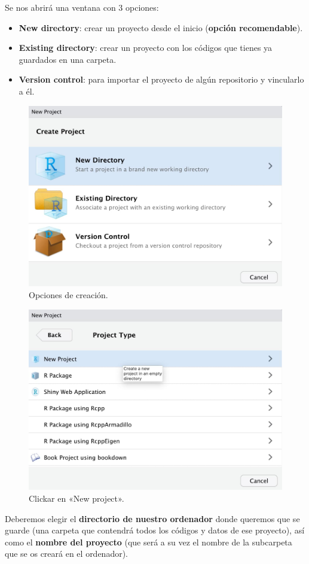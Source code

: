 \documentclass[11pt,]{book}
\begin{document}
Se nos abrirá una ventana con 3 opciones:

\begin{itemize}
\item
  \textbf{New directory}: crear un proyecto desde el inicio (\textbf{opción recomendable}).
\item
  \textbf{Existing directory}: crear un proyecto con los códigos que tienes ya guardados en una carpeta.
\item
  \textbf{Version control}: para importar el proyecto de algún repositorio y vincularlo a él.
\end{itemize}

\begin{figure}

{\centering \includegraphics[width=0.5\linewidth]{./img/crear_proyecto2} 

}

\caption{Opciones de creación.}\label{fig:crear-proyecto2}
\end{figure}

\begin{figure}

{\centering \includegraphics[width=0.5\linewidth]{./img/crear_proyecto3} 

}

\caption{Clickar en «New project».}\label{fig:crear-proyecto3}
\end{figure}

Deberemos elegir el \textbf{directorio de nuestro ordenador} donde queremos que se guarde (una carpeta que contendrá todos los códigos y datos de ese proyecto), así como el \textbf{nombre del proyecto} (que será a su vez el nombre de la subcarpeta que se os creará en el ordenador).
\end{document}
